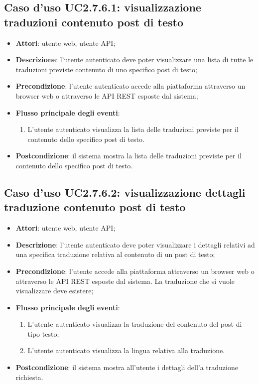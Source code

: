 \subsection{Caso d'uso UC2.7.6.1: visualizzazione traduzioni contenuto post di testo}
\begin{itemize}
\item \textbf{Attori}: utente web, utente API;
\item \textbf{Descrizione}: l'utente autenticato deve poter visualizzare una lista di tutte le traduzioni previste contenuto di uno specifico post di testo; 
      \item \textbf{Precondizione}: l'utente autenticato accede alla piattaforma attraverso un browser web o attraverso le API REST esposte dal sistema;

        \item \textbf{Flusso principale degli eventi}:
          \begin{enumerate}
          \item L'utente autenticato visualizza la lista delle traduzioni previste per il contenuto dello specifico post di testo.

      \end{enumerate}
    \item \textbf{Postcondizione}: il sistema mostra la lista delle traduzioni previste per il contenuto dello specifico post di testo.
  \end{itemize}
\hypertarget{UC2.7.6.2}{}
\subsection{Caso d'uso UC2.7.6.2: visualizzazione dettagli traduzione contenuto post di testo}
\begin{itemize}
\item \textbf{Attori}: utente web, utente API;
\item \textbf{Descrizione}: l'utente autenticato deve poter visualizzare i dettagli relativi ad una specifica traduzione relativa al contenuto di un post di testo; 
      \item \textbf{Precondizione}: l'utente accede alla piattaforma attraverso un browser web o attraverso le API REST esposte dal sistema. La traduzione che si vuole visualizzare deve esistere;

        \item \textbf{Flusso principale degli eventi}:
          \begin{enumerate}
          \item L'utente autenticato visualizza la traduzione del contenuto del post di tipo testo;
          \item L'utente autenticato visualizza la lingua relativa alla traduzione.

      \end{enumerate}
    \item \textbf{Postcondizione}: il sistema mostra all'utente i dettagli dell'a traduzione richiesta.
  \end{itemize}
\hypertarget{UC2.7.6.3}{}
